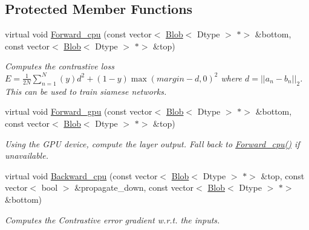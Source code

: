 \subsection*{Protected Member Functions}
\begin{DoxyCompactItemize}
\item 
virtual void \mbox{\hyperlink{classcaffe_1_1_contrastive_loss_layer_ae55966330621c1a2bd5a0012f2b09fe4}{Forward\+\_\+cpu}} (const vector$<$ \mbox{\hyperlink{classcaffe_1_1_blob}{Blob}}$<$ Dtype $>$ $\ast$$>$ \&bottom, const vector$<$ \mbox{\hyperlink{classcaffe_1_1_blob}{Blob}}$<$ Dtype $>$ $\ast$$>$ \&top)
\begin{DoxyCompactList}\small\item\em Computes the contrastive loss $ E = \frac{1}{2N} \sum\limits_{n=1}^N \left(y\right) d^2 + \left(1-y\right) \max \left(margin-d, 0\right)^2 $ where $ d = \left| \left| a_n - b_n \right| \right|_2 $. This can be used to train siamese networks. \end{DoxyCompactList}\item 
\mbox{\label{classcaffe_1_1_contrastive_loss_layer_abf66587f81d75255e4619c09a95da566}} 
virtual void \mbox{\hyperlink{classcaffe_1_1_contrastive_loss_layer_abf66587f81d75255e4619c09a95da566}{Forward\+\_\+gpu}} (const vector$<$ \mbox{\hyperlink{classcaffe_1_1_blob}{Blob}}$<$ Dtype $>$ $\ast$$>$ \&bottom, const vector$<$ \mbox{\hyperlink{classcaffe_1_1_blob}{Blob}}$<$ Dtype $>$ $\ast$$>$ \&top)
\begin{DoxyCompactList}\small\item\em Using the G\+PU device, compute the layer output. Fall back to \mbox{\hyperlink{classcaffe_1_1_contrastive_loss_layer_ae55966330621c1a2bd5a0012f2b09fe4}{Forward\+\_\+cpu()}} if unavailable. \end{DoxyCompactList}\item 
virtual void \mbox{\hyperlink{classcaffe_1_1_contrastive_loss_layer_a60af9729fe340be3ae0f87737215d9d0}{Backward\+\_\+cpu}} (const vector$<$ \mbox{\hyperlink{classcaffe_1_1_blob}{Blob}}$<$ Dtype $>$ $\ast$$>$ \&top, const vector$<$ bool $>$ \&propagate\+\_\+down, const vector$<$ \mbox{\hyperlink{classcaffe_1_1_blob}{Blob}}$<$ Dtype $>$ $\ast$$>$ \&bottom)
\begin{DoxyCompactList}\small\item\em Computes the Contrastive error gradient w.\+r.\+t. the inputs. \end{DoxyCompactList}\item 

\end{DoxyCompactItemize}

